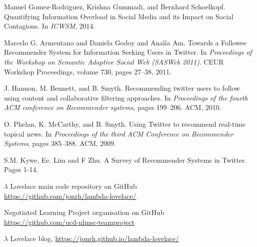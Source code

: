 \documentclass{article}
\begin{document}
%
\begin{thebibliography}{9} 

    Manuel Gomez-Rodriguez, Krishna Gummadi, and Bernhard Schoelkopf. Quantifying Information Overload in Social Media and its Impact on Social Contagions. In \textit{ICWSM}, 2014.
    
    Marcelo G. Armentano and Daniela Godoy and Analía Am. Towards a Followee Recommender System for Information Seeking Users in Twitter.  In \textit{Proceedings of the Workshop on Semantic Adaptive Social Web (SASWeb 2011)}. CEUR Workshop Proceedings, volume 730, pages 27–38, 2011.
    
    J. Hannon, M. Bennett, and B. Smyth. Recommending twitter users to follow using content and collaborative filtering approaches. In \textit{Proceedings of the fourth ACM conference on Recommender systems}, pages 199–206. ACM, 2010.
    
    O. Phelan, K. McCarthy, and B. Smyth. Using Twitter to recommend real-time topical news. In \textit{Proceedings of the third ACM Conference on Recommender Systems}, pages 385–388. ACM, 2009.
    
    S.M. Kywe, Ee. Lim and F Zhu.  A Survey of Recommender Systems in Twitter. Pages 1-14. 
    
	$\lambda$ Lovelace main code repository on GitHub \\
	\url{https://github.com/jonrh/lambda-lovelace/}
	
	Negotiated Learning Project organisation on GitHub \\
	\url{https://github.com/ucd-nlmsc-teamproject}
	
	$\lambda$ Lovelace blog, \url{https://jonrh.github.io/lambda-lovelace/}
	

\end{thebibliography}
\end{document}
